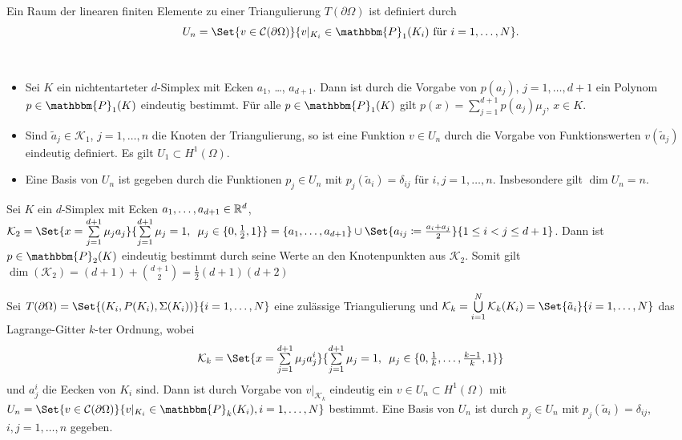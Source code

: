 \documentclass{cheat-sheet}
\newcommand{\Cont}{\mathcal{C}} %
\newcommand{\bOmega}{\partial \Omega} %
\newcommand{\Poly}{\mathbbm{P}} %
\begin{document}
\begin{defn}
  Ein Raum der linearen finiten Elemente zu einer Triangulierung $T(\bOmega)$ ist definiert durch
  \[
    U_n = \Set{v \in \Cont(\bOmega)}{v|_{K_i} \in \Poly_1(K_i) \text{ für } i = 1, \ldots, N}.
  \]
\end{defn}

\begin{satz} \mbox{} \\
  \begin{itemize}
    \item Sei $K$ ein nichtentarteter $d$-Simplex mit Ecken $a_1$, \ldots, $a_{d+1}$.
    Dann ist durch die Vorgabe von $p(a_j)$, $j = 1, \ldots, d+1$ ein Polynom $p \in \Poly_1(K)$ eindeutig bestimmt.
    Für alle $p \in \Poly_1(K)$ gilt $p(x) = \sum_{j=1}^{d+1} p(a_j) \mu_j$, $x \in K$.
    \item Sind $\tilde{a}_j \in \mathcal{K}_1$, $j = 1, \ldots, n$ die Knoten der Triangulierung, so ist eine Funktion $v \in U_n$ durch die Vorgabe von Funktionswerten $v(\tilde{a}_j)$ eindeutig definiert.
    Es gilt $U_1 \subset H^1(\Omega)$.
    \item Eine Basis von $U_n$ ist gegeben durch die Funktionen $p_j \in U_n$ mit $p_j(\tilde{a}_i) = \delta_{ij}$ für $i, j = 1, \ldots, n$.
    Insbesondere gilt $\dim U_n = n$.
  \end{itemize}
\end{satz}



\begin{bem}
  Sei $K$ ein $d$-Simplex mit Ecken $a_1, \ldots, a_{d+1} \in \mathbb{R}^d$, $\mathcal{K}_2 = \Set{x = \sum_{j=1}^{d+1} \mu_j a_j}{\sum_{j=1}^{d+1} \mu_j = 1, \enspace \mu_j \in \{ 0, \tfrac{1}{2}, 1 \}} = \{ a_1, \ldots, a_{d+1} \} \cup \Set{a_{ij} \coloneqq \tfrac{a_i + a_j}{2}}{1 \leq i < j \leq d+1}$.
  Dann ist $p \in \Poly_2(K)$ eindeutig bestimmt durch seine Werte an den Knotenpunkten aus $\mathcal{K}_2$.
  Somit gilt $\dim(\mathcal{K}_2) = (d+1) + \binom{d+1}{2} = \tfrac{1}{2} (d+1) (d+2)$
\end{bem}

\begin{satz}
  Sei $T(\bOmega) = \Set{(K_i, P(K_i), \Sigma(K_i))}{i = 1, \ldots, N}$ eine zulässige Triangulierung und $\mathcal{K}_k = \bigcup_{i=1}^N \mathcal{K}_k(K_i) = \Set{\tilde{a}_i}{i = 1, \ldots, N}$ das Lagrange-Gitter $k$-ter Ordnung, wobei
  \[
    \mathcal{K}_k = \Set{x = \sum_{j=1}^{d+1} \mu_j a_j^i}{\sum_{j=1}^{d+1} \mu_j = 1, \enspace \mu_j \in \{ 0, \tfrac{1}{k}, \ldots, \tfrac{k-1}{k}, 1 \}}
  \]
  und $a_j^i$ die Eecken von $K_i$ sind.
  Dann ist durch Vorgabe von $v|_{\mathcal{K}_k}$ eindeutig ein $v \in U_n \subset H^1(\Omega)$ mit $U_n = \Set{v \in \Cont(\bOmega)}{v|_{K_i} \in \Poly_k(K_i), i = 1, \ldots, N}$ bestimmt.
  Eine Basis von $U_n$ ist durch $p_j \in U_n$ mit $p_j(\tilde{a}_i) = \delta_{ij}$, $i, j = 1, \ldots, n$ gegeben.
\end{satz}
\end{document}
